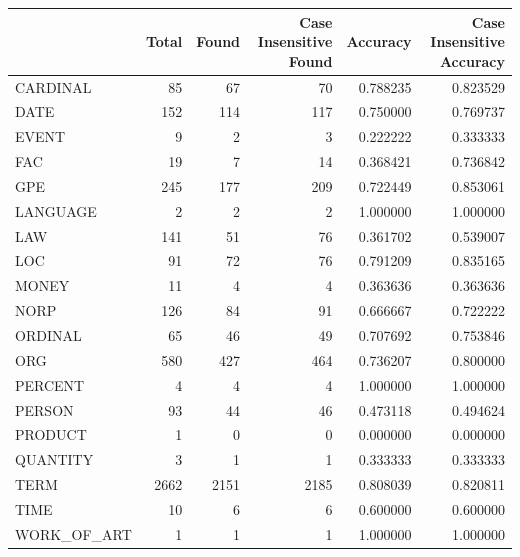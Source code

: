 \begin{tabular}{lrrrrr}
\toprule
 & Total & Found & Case Insensitive Found & Accuracy & Case Insensitive Accuracy \\
\midrule
CARDINAL & 85 & 67 & 70 & 0.788235 & 0.823529 \\
DATE & 152 & 114 & 117 & 0.750000 & 0.769737 \\
EVENT & 9 & 2 & 3 & 0.222222 & 0.333333 \\
FAC & 19 & 7 & 14 & 0.368421 & 0.736842 \\
GPE & 245 & 177 & 209 & 0.722449 & 0.853061 \\
LANGUAGE & 2 & 2 & 2 & 1.000000 & 1.000000 \\
LAW & 141 & 51 & 76 & 0.361702 & 0.539007 \\
LOC & 91 & 72 & 76 & 0.791209 & 0.835165 \\
MONEY & 11 & 4 & 4 & 0.363636 & 0.363636 \\
NORP & 126 & 84 & 91 & 0.666667 & 0.722222 \\
ORDINAL & 65 & 46 & 49 & 0.707692 & 0.753846 \\
ORG & 580 & 427 & 464 & 0.736207 & 0.800000 \\
PERCENT & 4 & 4 & 4 & 1.000000 & 1.000000 \\
PERSON & 93 & 44 & 46 & 0.473118 & 0.494624 \\
PRODUCT & 1 & 0 & 0 & 0.000000 & 0.000000 \\
QUANTITY & 3 & 1 & 1 & 0.333333 & 0.333333 \\
TERM & 2662 & 2151 & 2185 & 0.808039 & 0.820811 \\
TIME & 10 & 6 & 6 & 0.600000 & 0.600000 \\
WORK_OF_ART & 1 & 1 & 1 & 1.000000 & 1.000000 \\
\bottomrule
\end{tabular}
